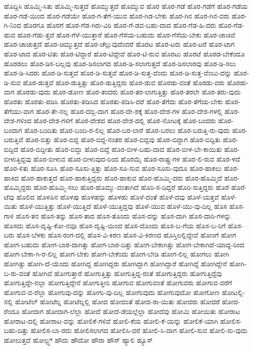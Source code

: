 {ಹೊದ್ದಿಸಿ
ಹೊಮ್ಮಿ-ಸಿತು
ಹೊಮ್ಮಿ-ಸುತ್ತದೆ
ಹೊಮ್ಮುತ್ತದೆ
ಹೊಮ್ಮುವ
ಹೊರ
ಹೊರ-ಗಡೆ
ಹೊರ-ಗಡೆಗೆ
ಹೊರ-ಗಡೆಯ
ಹೊರ-ಗಡೆ-ಯಿಂದ
ಹೊರ-ಗಡೆಯೇ
ಹೊರ-ಗ-ತೆಗೆ-ಯುವ
ಹೊರ-ಗಿಡ-ಬೇಕು
ಹೊರ-ಗಿನ
ಹೊರ-ಗಿನ-ವರು
ಹೊರ-ಗಿ-ನಿಂದ
ಹೊರಗೂ
ಹೊರಗೆ
ಹೊರ-ಗೆಡ-ಗಿರು-ವಿರಿ
ಹೊರ-ಗೆ-ಡವ-ಬಹು-ದಾದ
ಹೊರ-ಗೆಡ-ಹಿ-ದರು
ಹೊರ-ಗೆಡ-ಹುವ
ಹೊರ-ಗೆಡು-ತ್ತದೆ
ಹೊರ-ಗೆಳೆ-ಯುತ್ತಾರೆ
ಹೊರ-ಗೆಸೆಯ-ಬಹುದು
ಹೊರ-ಗೆಸೆಯ-ಬೇಕು
ಹೊರ-ಚಾಚಿವೆ
ಹೊರ-ಚಾಚುತ್ತದೆ
ಹೊರ-ಚಿಮ್ಮುತ್ತದೆ
ಹೊರ-ಚೆಲ್ಲುವುದೆಂದರೆ
ಹೊರಟ
ಹೊರ-ಟರು
ಹೊರ-ಟರೆ
ಹೊರ-ಟಾಗ
ಹೊರ-ಟಾದ
ಹೊರ-ಟಿತು
ಹೊರ-ಟಿದ್ದಾರೆ
ಹೊರ-ಟಿದ್ದೇವೆ
ಹೊರ-ಟಿ-ರುವ
ಹೊರಟು
ಹೊರಟೆ
ಹೊರಡ-ಬೇಕೆಂದೂ
ಹೊರಡಲು
ಹೊರ-ಡಿಸ-ಬಲ್ಲವು
ಹೊರ-ಡಿಸಲಾಗದ
ಹೊರ-ಡಿ-ಸಲಾಗುತ್ತದೆ
ಹೊರ-ಡಿಸಲಾರವು
ಹೊರ-ಡಿ-ಸಲು
ಹೊರ-ಡಿ-ಸಿದರು
ಹೊರ-ಡಿ-ಸುತ್ತದೆ
ಹೊರ-ಡಿ-ಸುತ್ತವೆ
ಹೊರ-ಡಿ-ಸುತ್ತ-ವೆಂದು
ಹೊರ-ಡಿ-ಸುತ್ತ-ವೆಂಬು-ದನ್ನು
ಹೊರ-ಡಿ-ಸುವ
ಹೊರ-ಡುತ್ತವೆ
ಹೊರ-ಡುತ್ತಿತ್ತು
ಹೊರ-ಡುತ್ತಿದ್ದರು
ಹೊರ-ಡುವ
ಹೊರಡು-ವಂತೆ
ಹೊರಡು-ವರು
ಹೊರಡು-ವಾಗ
ಹೊರಡು-ವುದು
ಹೊರ-ಡೋಣ
ಹೊರ-ತಂದರು
ಹೊರ-ತರ-ಲಾಗುತ್ತಿತ್ತು
ಹೊರ-ತರಲೇ
ಹೊರ-ತರು-ವುದು
ಹೊರತು
ಹೊರತು-ಪಡಿಸಿ
ಹೊರತು-ಪಡಿಸಿದ
ಹೊರತು-ಪಡಿಸಿ-ದರೆ
ಹೊರ-ತೆಗೆದು
ಹೊರ-ತೆಗೆಯ-ಬೇಕು
ಹೊರ-ತೆಗೆಯು-ವಾಗ
ಹೊರ-ತೇ-ನಲ್ಲ
ಹೊರ-ದಬ್ಬಿ-ದಾಗ
ಹೊರ-ದೇ-ಶಕ್ಕೆ
ಹೊರ-ದೇಶ-ಗಳ
ಹೊರ-ದೇಶ-ಗಳಲ್ಲಿ
ಹೊರ-ದೇಶ-ಗಳಿಂದ
ಹೊರ-ದೇಶ-ಗಳಿಗೆ
ಹೊರ-ದೇಶದ
ಹೊರ-ದೇಶ-ದಲ್ಲಿ
ಹೊರ-ನೋಟಕ್ಕೆ
ಹೊರ-ಬಂದರು
ಹೊರ-ಬಂದಾಗ
ಹೊರ-ಬಂದಿತು
ಹೊರ-ಬಂದಿ-ರ-ಲಿಲ್ಲ
ಹೊರ-ಬರ-ಲಾರೆ
ಹೊರ-ಬರಲು
ಹೊರ-ಬರುತ್ತಿ-ರು-ವುದು
ಹೊರ-ಬರುತ್ತಿವೆ
ಹೊರ-ಬಿತ್ತು
ಹೊರ-ಬಿದ್ದ
ಹೊರ-ಬಿದ್ದ-ನಂತರ
ಹೊರ-ಬಿದ್ದವು
ಹೊರ-ಬಿದ್ದಾಗ
ಹೊರ-ಬಿದ್ದಿತು
ಹೊರ-ಬಿದ್ದಿದೆ
ಹೊರ-ಬಿದ್ದೀತು
ಹೊರ-ಬಿದ್ದು
ಹೊರ-ಬಿದ್ದೆ
ಹೊರ-ಬೀಳ-ಬಹು-ದಾದ
ಹೊರ-ಬೀಳ-ಬೇ-ಕಾಯಿತು
ಹೊರ-ಬೀಳುತ್ತಿದ್ದವು
ಹೊರ-ಬೀಳುವ
ಹೊರ-ಬೀಳುವುದ-ರಿಂದ
ಹೊರಮೈ
ಹೊರ-ರಾಷ್ಟ್ರ-ಗಳ
ಹೊರ-ಲಿ-ರುವ
ಹೊರ-ಳದೆ
ಹೊರ-ಳಿತು
ಹೊರ-ಸೂಸಿ
ಹೊರ-ಸೂಸು-ತ್ತಿತ್ತು
ಹೊರ-ಸೂ-ಸುವ
ಹೊರ-ಸೂಸು-ವುದೂ
ಹೊರ-ಹಾಕಲು
ಹೊರ-ಹಾಕಿದ
ಹೊರ-ಹಾಕುತ್ತದೆ
ಹೊರ-ಹಾಕುತ್ತಿದ್ದರು
ಹೊರ-ಹಾಕುವ
ಹೊರ-ಹೊಮ್ಮಿ-ದರು
ಹೊರ-ಹೊಮ್ಮಿದೆ
ಹೊರ-ಹೊಮ್ಮಿದ್ದರು
ಹೊರ-ಹೊಮ್ಮಿ-ಸಲು
ಹೊರ-ಹೊಮ್ಮು-ವಂತಾಗಿದೆ
ಹೊರಿ-ಸ-ದಿದ್ದರೆ
ಹೊರಿ-ಸುತ್ತಿದ್ದರು
ಹೊರೆ
ಹೊರೆ-ಟೆವು
ಹೊಲಿದ
ಹೊಳಪಿನ
ಹೊಳಪು
ಹೊಳಹನ್ನು
ಹೊಳಹು
ಹೊಳೆ-ದಂತೆ
ಹೊಳೆ-ದವು
ಹೊಳೆ-ಯತ್ತವೆ
ಹೊಳೆ-ಯಿತು
ಹೊಳೆ-ಯುತ್ತಿತ್ತು
ಹೊಳೆ-ಯುತ್ತಿದೆ
ಹೊಳೆ-ಯುತ್ತಿದ್ದವು
ಹೊಳೆ-ಯುವ
ಹೊಳೆ-ಯು-ವು-ದಿಲ್ಲ
ಹೊಸ
ಹೊಸ-ಗಾಳಿ
ಹೊಸ-ತನ
ಹೊಸ-ತನ್ನು
ಹೊಸ-ತಾದ
ಹೊಸ-ತೊಂದು
ಹೊಸ-ದನ್ನು
ಹೊಸ-ದಾಗಿ
ಹೊಸ-ದಾರಿ-ಗಳನ್ನು
ಹೊಸದು
ಹೊಸ-ದೃಷ್ಟಿ-ಕೋ-ನವೂ
ಹೊಸ-ದೃಷ್ಟಿ-ಯಿಂದ
ಹೊಸ-ದೊಂದು
ಹೊಸ-ಬ-ಗೆಯ
ಹೊಸ-ಬ-ರಿಗೆ
ಹೊಸ-ಬರು
ಹೊಸ-ಬೆಳಕು
ಹೊಸ-ರಂಗ-ದಲ್ಲಿ
ಹೊಸ-ವಿ-ಕಿರಣ
ಹೊಸ-ವಿ-ಕಿರಣದ
ಹೊಸ್ತಿಲಲ್ಲಿದ್ದೇವೆ
ಹೋಂಗೆ
ಹೋಗ
ಹೋಗ-ಬಹುದು
ಹೋಗ-ಬಾರ-ದಾಗಿತ್ತು
ಹೋಗ-ಬಾರ-ದಿತ್ತು
ಹೋಗ-ಬೇಕಾಗಿತ್ತು
ಹೋಗ-ಬೇಕಾಗಿದೆ-ಯಾದ್ದ-ರಿಂದ
ಹೋಗ-ಬೇಕಾ-ಗಿ-ರ-ಲಿಲ್ಲ
ಹೋಗ-ಬೇಕು
ಹೋಗ-ಬೇಕೆಂದು
ಹೋಗ-ಬೇಡಿ
ಹೋಗ-ಲಿಲ್ಲ
ಹೋಗಲು
ಹೋಗಿ
ಹೋಗಿತ್ತು
ಹೋಗಿ-ದೆ-ಯೆಂದು
ಹೋಗಿದ್ದ
ಹೋಗಿದ್ದರು
ಹೋಗಿದ್ದಾಗ
ಹೋಗಿದ್ದಾರೆ
ಹೋಗಿದ್ದೆ
ಹೋಗಿದ್ದೇನೆ
ಹೋಗಿ-ಬ-ರು-ವಂತೆ
ಹೋಗಿವೆ
ಹೋಗುತ್ತಾರೆ
ಹೋಗುತ್ತಿತ್ತು
ಹೋಗುತ್ತಿದ್ದ-ರಂತೆ
ಹೋಗುತ್ತಿದ್ದರು
ಹೋಗುತ್ತಿದ್ದೆವು
ಹೋಗುತ್ತಿದ್ದೇ-ನಲ್ಲಾ
ಹೋಗುತ್ತಿದ್ದೇನೆ
ಹೋಗುತ್ತೀರಿ
ಹೋಗುವ
ಹೋಗುವಂತೆ
ಹೋಗುವರು
ಹೋಗುವ-ವರೆಗೆ
ಹೋಗುವ-ವ-ರೆಲ್ಲಾ
ಹೋಗುವು-ದನ್ನು
ಹೋಗು-ವು-ದಿಲ್ಲ
ಹೋಗುವುದು
ಹೋಗುವುದೋ
ಹೋಗೋಣ
ಹೋಟಲ್ಲಿ-ನಲ್ಲಿ
ಹೋಟೆಲ್
ಹೋಟೆಲ್ನ
ಹೋಟೆಲ್ನಲ್ಲಿ
ಹೋದ
ಹೋದಂತೆ
ಹೋದ-ರಾ-ಯಿತು
ಹೋದರು
ಹೋದರೆ
ಹೋದ-ರೆಂದೂ
ಹೋದಾಗ
ಹೋದಾಗ-ಲೆಲ್ಲಾ
ಹೋದೆ
ಹೋದೆ-ಡೆಯಲ್ಲೆಲ್ಲಾ
ಹೋದೆವು
ಹೋಮಿ
ಹೋಯಿತು
ಹೋರಾಟ
ಹೋರಾಟ-ದಲ್ಲಿ
ಹೋರಾಟ-ವನ್ನು
ಹೋಲಿಕೆ-ಗಳಿವೆ
ಹೋಲಿ-ಕೆಯ
ಹೋಲಿ-ಕೆ-ಯನ್ನು
ಹೋಲಿಕೆ-ಯಾಗಿ
ಹೋಲಿಸ-ಬಹು-ದಿತ್ತು
ಹೋಲಿಸ-ಬಾ-ರದು
ಹೋಲಿಸಲಾಗದ
ಹೋಲಿಸಿ-ದರೆ
ಹೋಲಿ-ಸಿ-ದಾಗ
ಹೋಲಿ-ಸುವ
ಹೋಲಿ-ಸು-ವುದು
ಹೋಲುತ್ತದೆ
ಹೋಲ್ಟ್ಸ್
ಹೌದು
ಹೌದೋ
ಹೌರಾ
ಹೌಸ್
ಹ್ಯಾಲಿ
ಹ್ಯೂಸ್
}

